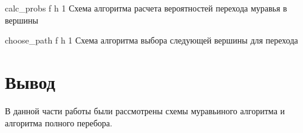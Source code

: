 {calc_probs} %
{f} %
{h} %
{1\textwidth} %
{Схема алгоритма расчета вероятностей перехода муравья в вершины} %

{choose_path} %
{f} %
{h} %
{1\textwidth} %
{Схема алгоритма выбора следующей вершины для перехода} %

\section*{Вывод}
В данной части работы были рассмотрены схемы муравьиного алгоритма и алгоритма полного перебора.
